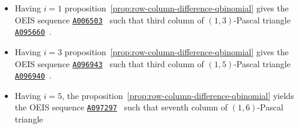 \begin{itemize}
    \item Having $i=1$ proposition~\eqref{prop:row-column-difference-qbinomial}
    gives the OEIS sequence \href{https://oeis.org/A006503}{\texttt{A006503}}~\cite{sloane1995n}
    such that third column of $(1,3)$-Pascal triangle
    \href{https://oeis.org/A095660}{\texttt{A095660}}~\cite{sloane2004pascal13}.
    \item Having $i=3$ proposition~\eqref{prop:row-column-difference-qbinomial}
    gives the OEIS sequence \href{https://oeis.org/A096943}{\texttt{A096943}}~\cite{sloane2004sixth}
    such that third column of $(1,5)$-Pascal triangle
    \href{https://oeis.org/A096940}{\texttt{A096940}}~\cite{sloane2004pascal}.
    \item Having $i=5$, the proposition~\eqref{prop:row-column-difference-qbinomial} yields
    the OEIS sequence \href{https://oeis.org/A097297}{\texttt{A097297}}~\cite{sloane2004seventh}
    such that seventh column of $(1,6)$-Pascal triangle
\end{itemize}
